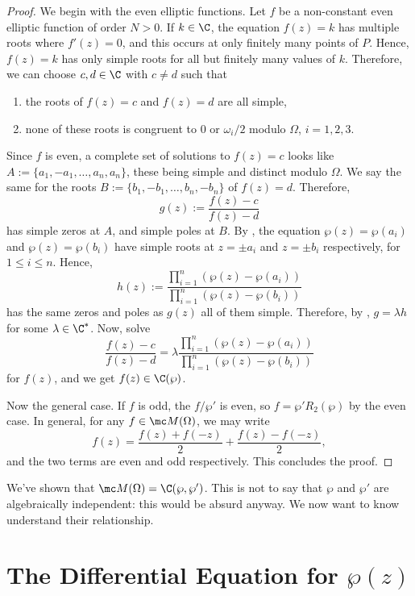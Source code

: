 \documentclass[11pt]{report}
\begin{document}
\begin{proof}
    We begin with the even elliptic functions. Let $f$ be a non-constant even elliptic function of order $N>0$. If $k \in \C$, the equation $f(z)=k$ has multiple roots where $f'(z)=0$, and this occurs at only finitely many points of $P$. Hence, $f(z)=k$ has only simple roots for all but finitely many values of $k$. Therefore, we can choose $c,d \in \C$ with $c \neq d$ such that
    \begin{enumerate}
        \item[(a)] the roots of $f(z)=c$ and $f(z)=d$ are all simple,
        \item[(b)] none of these roots is congruent to $0$ or $\omega_i/2$ modulo $\Omega$, $i=1,2,3$.
    \end{enumerate}
    Since $f$ is even, a complete set of solutions to $f(z)=c$ looks like $A:=\{a_1,-a_1,\dots,a_n,a_n\}$, these being simple and distinct modulo $\Omega$. We say the same for the roots $B:=\{b_1,-b_1,\dots,b_n,-b_n\}$ of $f(z)=d$. Therefore,
    $$g(z):=\frac{f(z)-c}{f(z)-d}$$
    has simple zeros at $A$, and simple poles at $B$. By , the equation $\wp(z) = \wp(a_i)$ and $\wp(z)=\wp(b_i)$ have simple roots at $z = \pm a_i$ and $z = \pm b_i$ respectively, for $1 \leq i \leq n$. Hence,
    $$h(z):= \frac{\prod_{i=1}^n(\wp(z) - \wp(a_i))}{\prod_{i=1}^n(\wp(z)-\wp(b_i))}$$
    has the same zeros and poles as $g(z)$ all of them simple. Therefore, by , $g=\lambda h$ for some $\lambda \in \C^*$. Now, solve
    $$\frac{f(z)-c}{f(z)-d}=\lambda \frac{\prod_{i=1}^n(\wp(z)-\wp(a_i))}{\prod_{i=1}^n(\wp(z)-\wp(b_i))}$$
    for $f(z)$, and we get $f(z) \in \C(\wp)$.

    Now the general case. If $f$ is odd, the $f/\wp'$ is even, so $f=\wp'R_2(\wp)$ by the even case. In general, for any $f \in \mc M(\Omega)$, we may write
    $$f(z) = \frac{f(z) + f(-z)}{2}+\frac{f(z)-f(-z)}{2},$$
    and the two terms are even and odd respectively. This concludes the proof.
\end{proof}

We've shown that $\mc M(\Omega) = \C(\wp, \wp')$. This is not to say that $\wp$ and $\wp'$ are algebraically independent: this would be absurd anyway. We now want to know understand their relationship.

\section{\texorpdfstring{The Differential Equation for $\wp(z)$}{The Differential Equation for p(z)}}
\end{document}
